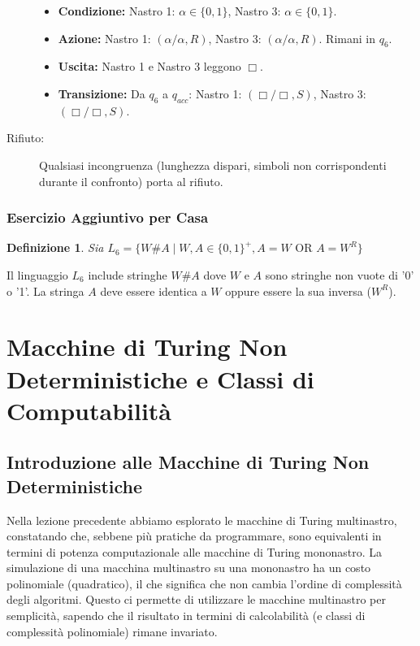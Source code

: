 \documentclass[a4paper, 11pt]{book} %
\newtheorem{definition}[theorem]{Definizione}
\theoremstyle{definition}
\begin{document}
\begin{description}
\begin{itemize}
        \item \textbf{Condizione:} Nastro 1: $\alpha \in \{0,1\}$, Nastro 3: $\alpha \in \{0,1\}$.
        \item \textbf{Azione:} Nastro 1: $(\alpha/\alpha, R)$, Nastro 3: $(\alpha/\alpha, R)$. Rimani in $q_6$.
        \item \textbf{Uscita:} Nastro 1 e Nastro 3 leggono $\Box$.
        \item \textbf{Transizione:} Da $q_6$ a $q_{acc}$: Nastro 1: $(\Box/\Box, S)$, Nastro 3: $(\Box/\Box, S)$.
    \end{itemize}
    \item[Rifiuto:] Qualsiasi incongruenza (lunghezza dispari, simboli non corrispondenti durante il confronto) porta al rifiuto.
\end{description}

\subsection{Esercizio Aggiuntivo per Casa}
\begin{definition}
Sia $L_6 = \{W\#A \mid W,A \in \{0,1\}^+, A=W \text{ OR } A=W^R\}$
\end{definition}
Il linguaggio $L_6$ include stringhe $W\#A$ dove $W$ e $A$ sono stringhe non vuote di '0' o '1'. La stringa $A$ deve essere identica a $W$ oppure essere la sua inversa ($W^R$).



\chapter{Macchine di Turing Non Deterministiche e Classi di Computabilità}



\section{Introduzione alle Macchine di Turing Non Deterministiche}

Nella lezione precedente abbiamo esplorato le macchine di Turing multinastro, constatando che, sebbene più pratiche da programmare, sono equivalenti in termini di potenza computazionale alle macchine di Turing mononastro. La simulazione di una macchina multinastro su una mononastro ha un costo polinomiale (quadratico), il che significa che non cambia l'ordine di complessità degli algoritmi. Questo ci permette di utilizzare le macchine multinastro per semplicità, sapendo che il risultato in termini di calcolabilità (e classi di complessità polinomiale) rimane invariato.
\end{document}
